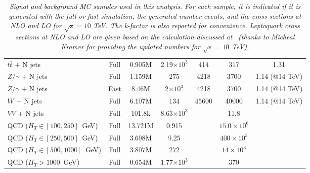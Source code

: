 \begin{table}[htb]
\begin{center}
\begin{tabular}{|l|cccccc|}
\hline
      $t\bar{t}$ + N jets         & Full      & 0.905M    &    2.19$\times 10^3$   & 414                 &  317                  & 1.31 \\
      $Z/\gamma$ + N jets         & Full      & 1.159M    &    275	           & 4218                &  3700                 & 1.14 (@14 TeV)\\
      $Z/\gamma$ + N jets         & Fast      & 8.46M     &    2$\times 10^3$      & 4218                &  3700                 & 1.14 (@14 TeV)\\
      $W$ + N jets                & Full      & 6.107M    &     134	           & 45600               &  40000                & 1.14 (@14 TeV)\\
      $VV$ + N jets               & Full      & 101.8k    &    8.63$\times 10^3$   &                     &  11.8                 & \\ \hline
      QCD ($H_T\in[100,250]$~GeV) & Full      & 13.721M   &    0.915	           &                     &  $15.0 \times 10^6$   & \\
      QCD ($H_T\in[250,500]$~GeV) & Full      & 3.698M    &    9.25	           &                     &  $400 \times 10^3$    & \\
      QCD ($H_T\in[500,1000]$~GeV)& Full      & 3.807M    &     272	           &                     &  $14 \times 10^3$     & \\
      QCD ($H_T>1000$~GeV)        & Full      & 0.654M    &    1.77$\times 10^3$   &                     &  $370$                & \\
\hline\hline
    \end{tabular}
    \caption{\small \sl Signal and background MC samples used in this analysis. For each sample, it is indicated 
      if it is generated with the full or fast simulation, the generated number events, 
      and the cross sections at NLO and LO for $\sqrt{s}=10$ TeV. 
      The k-factor is also reported for convenience. Leptoquark cross sections at NLO and LO
      are given based on the calculation discussed at~\cite{Kramer} (thanks to Micheal Kramer 
      for providing the updated numbers for $\sqrt{s}=10$ TeV).}
  \end{center}
\end{table}


